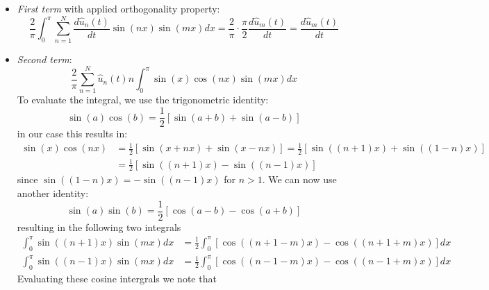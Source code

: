 \begin{itemize}
	\item \textit{First term} with applied orthogonality property:
	      \begin{equation}
		      \frac{2}{\pi}\int_0^{\pi} \sum_{n=1}^{N} \frac{d\hat{u}_n(t)}{dt} \sin(nx)\sin(mx) dx = \frac{2}{\pi} \cdot \frac{\pi}{2} \frac{d\hat{u}_m(t)}{dt} = \frac{d\hat{u}_m(t)}{dt}
		      \label{eq:ft}
	      \end{equation}

	\item \textit{Second term}:
	      \begin{equation}
		      \frac{2}{\pi}\sum_{n=1}^{N} \hat{u}_n(t) n \int_0^{\pi} \sin(x)\cos(nx)\sin(mx) dx
		      \label{eq:st}
	      \end{equation}
	      To evaluate the integral, we use the trigonometric identity:
	      \begin{equation}
		      \sin(a)\cos(b) = \frac{1}{2}[\sin(a+b) + \sin(a-b)]
		      \label{eq:cossin_id}
	      \end{equation}
	      in our case this results in:
	      \begin{equation}
		      \begin{aligned}
			      \sin(x)\cos(nx) & = \frac{1}{2}[\sin(x+nx) + \sin(x-nx)] = \frac{1}{2}[\sin((n+1)x) + \sin((1-n)x)] \\
			                      & = \frac{1}{2}[\sin((n+1)x) - \sin((n-1)x)]
			      \label{eq:cossin_ida}
		      \end{aligned}
	      \end{equation}
	      since $\sin((1-n)x) = -\sin((n-1)x)$ for $n > 1$.
	      We can now use another identity:
	      \begin{equation}
		      \sin(a)\sin(b) = \frac{1}{2}[\cos(a-b) - \cos(a+b)]
		      \label{eq:sinsin_id}
	      \end{equation}
	      resulting in the following two integrals
	      \begin{equation}
		      \begin{aligned}
			      \int_0^{\pi} \sin((n+1)x)\sin(mx) dx & = \frac{1}{2}\int_0^{\pi} [\cos((n+1-m)x) - \cos((n+1+m)x)] dx \\
			      \int_0^{\pi} \sin((n-1)x)\sin(mx) dx & = \frac{1}{2}\int_0^{\pi} [\cos((n-1-m)x) - \cos((n-1+m)x)] dx
		      \end{aligned}
		      \label{eq:sinsin_ida}
	      \end{equation}
	      Evaluating these cosine intergrals we note that

\end{itemize}
